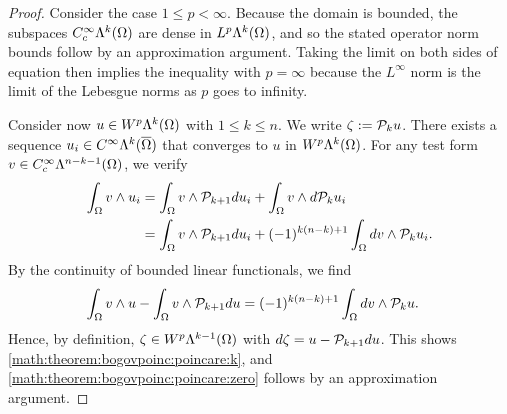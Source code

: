\documentclass[10pt,a4paper]{article}
\newcommand{\todo}[1]{{\color{RedOrange}\textbf{#1}}}
\begin{document}
\begin{proof}
    Consider the case $1 \leq p < \infty$.
    Because the domain is bounded, 
    the subspaces $C^{\infty}_{c}\Lambda^{k}(\Omega)$ are dense in $L^{p}\Lambda^{k}(\Omega)$,
    and so the stated operator norm bounds follow by an approximation argument. 
    Taking the limit on both sides of equation then implies the inequality with $p = \infty$
    because the $L^{\infty}$ norm is the limit of the Lebesgue norms as $p$ goes to infinity. 
    
    
    Consider now $u \in W^{p}\Lambda^{k}(\Omega)$ with $1 \leq k \leq n$. 
    We write $\zeta := {\mathcal P}_{k  } u$. 
    There exists a sequence $u_{i} \in C^{\infty}\Lambda^{k}(\overline\Omega)$ that converges to $u$ in $W^{p}\Lambda^{k}(\Omega)$. 
    For any test form $v \in C^{\infty}_{c}\Lambda^{n-k-1}(\Omega)$, we verify 
    \begin{align*}
        \int_{\Omega} v \wedge u_{i} 
        &=
        \int_{\Omega} v \wedge {\mathcal P}_{k+1} d u_{i}
        +
        \int_{\Omega} v \wedge d {\mathcal P}_{k  } u_{i}
        \\&=
        \int_{\Omega} v \wedge {\mathcal P}_{k+1} d u_{i}
        +
        (-1)^{k(n-k)+1}
        \int_{\Omega} d v \wedge {\mathcal P}_{k  } u_{i}
        .
    \end{align*}
    By the continuity of bounded linear functionals, we find 
    \begin{align*}
        \int_{\Omega} v \wedge u 
        -
        \int_{\Omega} v \wedge {\mathcal P}_{k+1} d u 
        &=
        (-1)^{k(n-k)+1}
        \int_{\Omega} d v \wedge {\mathcal P}_{k  } u 
        .
    \end{align*}
    Hence, by definition, $\zeta \in W^{p}\Lambda^{k-1}(\Omega)$ with $d \zeta = u - {\mathcal P}_{k+1} d u$.
    This shows \eqref{math:theorem:bogovpoinc:poincare:k}, and \eqref{math:theorem:bogovpoinc:poincare:zero} follows by an approximation argument.
    
    
    

\end{proof}
\end{document}
